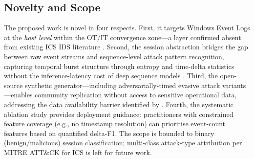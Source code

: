 \subsection{Novelty and Scope}

The proposed work is novel in four respects. First, it targets Windows Event Logs at the
\emph{host level} within the OT/IT convergence zone—a layer confirmed absent from existing
ICS IDS literature \cite{mitchell2014survey,conti2021survey}. Second, the session
abstraction bridges the gap between raw event streams and sequence-level attack pattern
recognition, capturing temporal burst structure through entropy and time-delta statistics
without the inference-latency cost of deep sequence models \cite{du2017deeplog}. Third, the
open-source synthetic generator—including adversarially-timed evasive attack variants—enables
community replication without access to sensitive operational data, addressing the data
availability barrier identified by \cite{nafees2023}. Fourth, the systematic ablation study
provides deployment guidance: practitioners with constrained feature coverage (e.g.,
no timestamp resolution) can prioritise event-count features based on quantified delta-F1.
The scope is bounded to binary (benign/malicious) session classification; multi-class
attack-type attribution per MITRE ATT\&CK for ICS \cite{mitre2020attack} is left for
future work.
